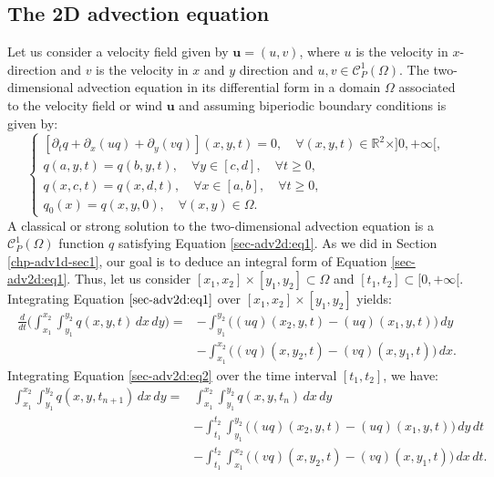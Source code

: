 \subsection{The 2D advection equation}
\label{chp-adv2d-sec1}
Let us consider a  velocity field given by $\boldsymbol{u}=(u,v)$, where
$u$ is the velocity in $x$-direction and $v$ is the velocity in $x$ and $y$ direction
and $u,v \in \mathcal{C}^1_P(\Omega)$.
The two-dimensional advection equation in its differential form in 
a domain $\Omega$ associated to the velocity field or wind $\boldsymbol{u}$ 
and assuming biperiodic boundary conditions is given by:
\begin{equation}
	\label{sec-adv2d:eq1}
	\begin{cases}
		[{\partial_t q} + {\partial_x (uq)} +  {\partial_y (vq)}](x, y, t)
		= 0, \quad \forall (x,y,t) \in \mathbb{R}^2\times ]0, +\infty[,\\
		{q}(a, y, t) = {q}(b, y, t), \quad \forall y \in [c,d],  \quad \forall t\geq 0, \\
		{q}(x, c, t) = {q}(x, d, t), \quad \forall x \in [a,b],  \quad \forall t\geq 0, \\
		q_0(x) = q(x,y,0), \quad \forall (x,y) \in \Omega.
	\end{cases}
\end{equation} 
A classical or strong solution to the two-dimensional advection equation is a 
$\mathcal{C}^1_P{(\Omega)}$ function ${q}$ satisfying Equation \eqref{sec-adv2d:eq1}.
As we did in Section \ref{chp-adv1d-sec1}, our goal is to deduce an
integral form of Equation \eqref{sec-adv2d:eq1}.
Thus, let us consider  $[x_1,x_2] \times [y_1, y_2]
\subset \Omega$ and $[t_1,t_2] \subset [0, +\infty[$.
Integrating Equation $\eqref{sec-adv2d:eq1}$ over 
$[x_1,x_2] \times [y_1, y_2]$ yields:
\begin{align}
	\label{sec-adv2d:eq2}
	\frac{d}{d t} \bigg(\int_{x_1}^{x_2} \int_{y_1}^{y_2}
	{q}(x, y, t) \,dx \,dy \bigg)=
	&-\int_{y_1}^{y_2} \bigg({(uq)}(x_2, y, t)
	-{(uq)}(x_1, y, t) \bigg) \,dy \\ \nonumber
	&-\int_{x_1}^{x_2} \bigg({(vq)}(x, y_2, t)
	-{(vq)}(x, y_1, t) \bigg) \,dx.
\end{align}
Integrating Equation \eqref{sec-adv2d:eq2} over the time interval $[t_1,t_2]$, 
we have:
\begin{align}
	\label{sec-adv2d:eq3}
	\int_{x_1}^{x_2} \int_{y_1}^{y_2}
	{q}(x, y, t_{n+1}) \,dx \,dy = &\int_{x_1}^{x_2} \int_{y_1}^{y_2}
	{q}(x, y, t_n) \,dx \,dy \\ \nonumber
	&-\int_{t_1}^{t_2} \int_{y_1}^{y_2} \bigg({(uq)}(x_2, y, t)
	-{(uq)}(x_1, y, t) \bigg) \,dy \,dt\\ \nonumber
	&-\int_{t_1}^{t_2} \int_{x_1}^{x_2} \bigg({(vq)}(x, y_2, t)
	-{(vq)}(x, y_1, t) \bigg) \,dx \,dt.
\end{align}
